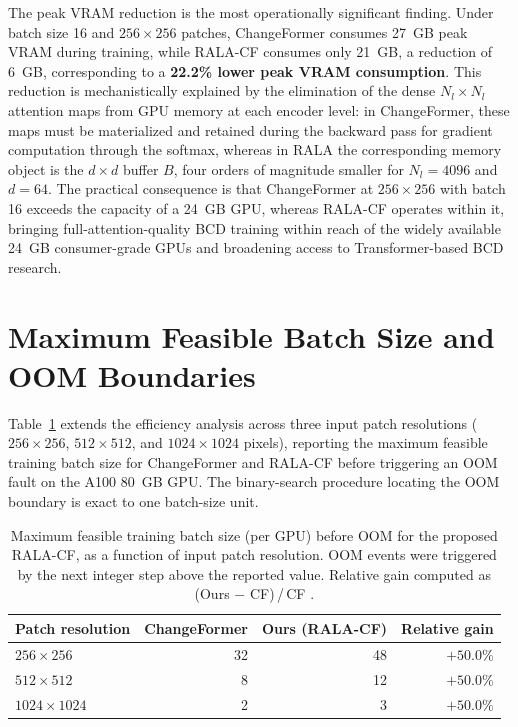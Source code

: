 The peak \ac{VRAM} reduction is the most operationally significant finding. Under batch size 16 and $256 \times 256$ patches, ChangeFormer consumes 27~GB peak \ac{VRAM} during training, while \ac{RALA-CF} consumes only 21~GB, a reduction of 6~GB, corresponding to a \textbf{22.2\% lower peak \ac{VRAM} consumption}. This reduction is mechanistically explained by the elimination of the dense $N_l \times N_l$ attention maps from \ac{GPU} memory at each encoder level: in ChangeFormer, these maps must be materialized and retained during the backward pass for gradient computation through the softmax, whereas in \ac{RALA} the corresponding memory object is the $d \times d$ buffer $B$, four orders of magnitude smaller for $N_l = 4096$ and $d = 64$. The practical consequence is that ChangeFormer at $256 \times 256$ with batch 16 exceeds the capacity of a 24~GB \ac{GPU}, whereas \ac{RALA-CF} operates within it, bringing full-attention-quality \ac{BCD} training within reach of the widely available 24~GB consumer-grade \ac{GPU}s and broadening access to Transformer-based \ac{BCD} research.


\section{Maximum Feasible Batch Size and OOM Boundaries}
\label{sec:exp-batch}

Table~\ref{tab:batch_oom} extends the efficiency analysis across three input patch resolutions ($256 \times 256$, $512 \times 512$, and $1024 \times 1024$ pixels), reporting the maximum feasible training batch size for ChangeFormer and \ac{RALA-CF} before triggering an \ac{OOM} fault on the A100 80~GB \ac{GPU}. The binary-search procedure locating the \ac{OOM} boundary is exact to one batch-size unit.

\begin{table}[htbp]
\centering
\caption{Maximum feasible training batch size (per \ac{GPU}) before \ac{OOM} for the proposed \ac{RALA-CF}, as a function of input patch resolution. \ac{OOM} events were triggered by the next integer step above the reported value. Relative gain computed as (Ours $-$ CF)\,/\,CF \cite{acuna2026efficient}.}
\label{tab:batch_oom}
\renewcommand{\arraystretch}{1.15} {\small
\begin{tabular}{|l|r|r|r|}
\hline
\textbf{Patch resolution}
    & \textbf{ChangeFormer}
    & \textbf{Ours (RALA-CF)}
    & \textbf{Relative gain} \\
\hline\hline
$256 \times 256$   & 32 & 48 & $+50.0\%$ \\
\hline
$512 \times 512$   &  8 & 12 & $+50.0\%$ \\
\hline
$1024 \times 1024$ &  2 &  3 & $+50.0\%$ \\
\hline
\end{tabular}
}
\end{table}

